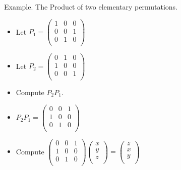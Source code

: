 \documentclass{beamer}
\begin{document}
\begin{frame}{Example. The Product of two elementary permutations.}

\begin{itemize}
\item Let
$P_1=
\begin{pmatrix}
1 & 0 & 0 \\
0 & 0 & 1 \\
0 & 1 & 0 \\
\end{pmatrix}
$
\item Let
$P_2=
\begin{pmatrix}
0 & 1 & 0 \\
1 & 0 & 0 \\
0 & 0 & 1 \\
\end{pmatrix}
$
\item Compute $P_2 P_1$.
\item $P_2 P_1=
\begin{pmatrix}
0 & 0 & 1 \\
1 & 0 & 0 \\
0 & 1 & 0 \\
\end{pmatrix}
$
\item Compute $
\begin{pmatrix}
0 & 0 & 1 \\
1 & 0 & 0 \\
0 & 1 & 0 \\
\end{pmatrix}
\begin{pmatrix}
x \\ y \\ z\\
\end{pmatrix}
=
\begin{pmatrix}
z \\ x \\ y\\
\end{pmatrix}
$
\end{itemize}
\end{frame}

\end{document}
